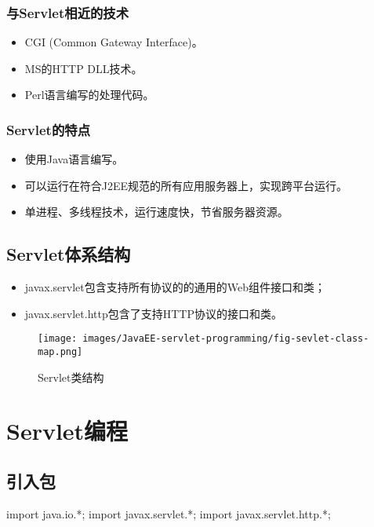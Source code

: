 \subsubsection{与Servlet相近的技术}

\begin{itemize}
\item CGI (Common Gateway Interface)。
\item MS的HTTP DLL技术。
\item Perl语言编写的处理代码。
\end{itemize}

\subsubsection{Servlet的特点}

\begin{itemize}
\item 使用Java语言编写。
\item 可以运行在符合J2EE规范的所有应用服务器上，实现跨平台运行。
\item 单进程、多线程技术，运行速度快，节省服务器资源。
\end{itemize}

\subsection{Servlet体系结构}

\begin{itemize}
\item javax.servlet包含支持所有协议的的通用的Web组件接口和类；
\item javax.servlet.http包含了支持HTTP协议的接口和类。
\end{itemize}

\begin{figure}[htb]
\centering
\texttt{[image: images/JavaEE-servlet-programming/fig-sevlet-class-map.png]}
\caption{Servlet类结构}
\label{fig:sevlet-class-map}
\end{figure}

\section{Servlet编程}

\subsection{引入包} 

\begin{javaCode}
  import java.io.*;
  import javax.servlet.*;
  import javax.servlet.http.*;
\end{javaCode}

